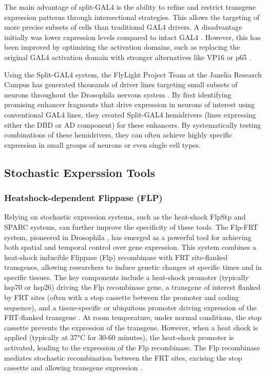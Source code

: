 \documentclass[../main/thesis_msc.tex]{subfiles}
\begin{document}
	The main advantage of split-GAL4 is the ability to refine and restrict transgene expression patterns through intersectional strategies. This allows the targeting of more precise subsets of cells than traditional GAL4 drivers. A disadvantage initially was lower expression levels compared to intact GAL4 \autocite{luan_refined_2006}. However, this has been improved by optimizing the activation domains, such as replacing the original GAL4 activation domain with stronger alternatives like VP16 or p65 \autocite{pfeiffer_refinement_2010}.

	Using the Split-GAL4 system, the FlyLight Project Team at the Janelia Research Campus has generated thousands of driver lines targeting small subsets of neurons throughout the Drosophila nervous system \autocite{dionne_genetic_2018}. By first identifying promising enhancer fragments that drive expression in neurons of interest using conventional GAL4 lines, they created Split-GAL4 hemidrivers (lines expressing either the DBD or AD component) for these enhancers. By systematically testing combinations of these hemidrivers, they can often achieve highly specific expression in small groups of neurons or even single cell types.

	\subsection{Stochastic Experssion Tools}
	\subsubsection{Heatshock-dependent Flippase (FLP)}

	Relying on stochastic expression systems, such as the heat-shock FlpStp and SPARC systems, can further improve the specificity of these tools. The Flp-FRT system, pioneered in Drosophila \autocite{golic_flp_1989, struhl_organizing_1993}, has emerged as a powerful tool for achieving both spatial and temporal control over gene expression. This system combines a heat-shock inducible Flippase (Flp) recombinase with FRT site-flanked transgenes, allowing researchers to induce genetic changes at specific times and in specific tissues. The key components include a heat-shock promoter (typically hsp70 or hsp26) driving the Flp recombinase gene, a transgene of interest flanked by FRT sites (often with a stop cassette between the promoter and coding sequence), and a tissue-specific or ubiquitous promoter driving expression of the FRT-flanked transgene \autocite{mcguire_spatiotemporal_2004}. At room temperature, under normal conditions, the stop cassette prevents the expression of the transgene. However, when a heat shock is applied (typically at 37°C for 30-60 minutes), the heat-shock promoter is activated, leading to the expression of the Flp recombinase. The Flp recombinase mediates stochastic recombination between the FRT sites, excising the stop cassette and allowing transgene expression \autocite{golic_flp_1989}.
\end{document}
